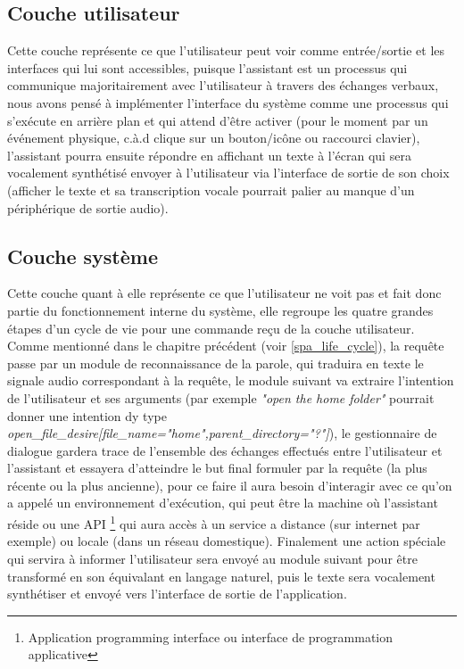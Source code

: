 	\subsection{Couche utilisateur}
	Cette couche représente ce que l'utilisateur peut voir comme entrée/sortie et les interfaces qui lui sont accessibles, puisque l'assistant est un processus qui communique majoritairement avec l'utilisateur à travers des échanges verbaux, nous avons pensé à implémenter l'interface du système comme une processus qui s'exécute en arrière plan et qui attend d'être activer (pour le moment par un événement physique, c.à.d clique sur un bouton/icône ou raccourci clavier), l'assistant pourra ensuite répondre en affichant un texte à l'écran qui sera vocalement synthétisé envoyer à l'utilisateur via l'interface de sortie de son choix (afficher le texte et sa transcription vocale pourrait palier au manque d'un périphérique de sortie audio).
	\subsection{Couche système }
	Cette couche quant à elle représente ce que l'utilisateur ne voit pas et fait donc partie du fonctionnement interne du système, elle regroupe les quatre grandes étapes d'un cycle de vie pour une commande reçu de la couche utilisateur. Comme mentionné dans le chapitre précédent (voir \ref{spa_life_cycle}), la requête passe par un module de reconnaissance de la parole, qui traduira en texte le signale audio correspondant à la requête, le module suivant va extraire l'intention de l'utilisateur et ses arguments (par exemple \textit{"open the home folder"} pourrait donner  une intention dy type  \textit{open\_file\_desire[file\_name="home",parent\_directory="?"]}), le gestionnaire de dialogue gardera trace de l'ensemble des échanges effectués entre l'utilisateur et l'assistant et essayera d'atteindre le but final formuler par la requête (la plus récente ou la plus ancienne), pour ce faire il aura besoin d'interagir avec ce qu'on a appelé un environnement d'exécution, qui peut être la machine où l'assistant réside ou une API \footnote{Application programming interface ou interface de programmation applicative } qui aura accès à un service a distance (sur internet par exemple) ou locale (dans un réseau domestique). Finalement une action spéciale qui servira à informer l'utilisateur sera envoyé au module suivant pour être transformé en son équivalant en langage naturel, puis le texte sera vocalement synthétiser et envoyé vers l'interface de sortie de l'application.

